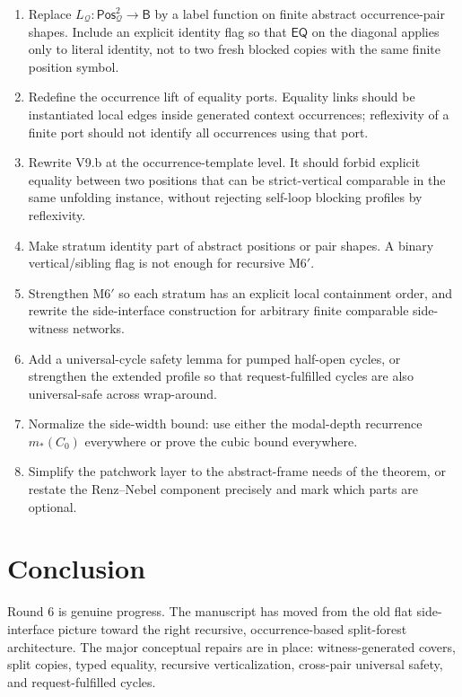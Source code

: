 \documentclass[11pt]{article}
\newcommand{\EQ}{\mathsf{EQ}}
\newcommand{\Base}{\mathsf{B}}
\newcommand{\Q}{\mathcal Q}
\newcommand{\Pos}{\mathsf{Pos}}
\begin{document}
\begin{enumerate}[leftmargin=2em,label=(R\arabic*)]
  \item Replace $L_{\Q}:\Pos_{\Q}^{2}\to\Base$ by a label function on
        finite abstract occurrence-pair shapes.  Include an explicit identity
        flag so that $\EQ$ on the diagonal applies only to literal identity,
        not to two fresh blocked copies with the same finite position symbol.
  \item Redefine the occurrence lift of equality ports.  Equality links should
        be instantiated local edges inside generated context occurrences;
        reflexivity of a finite port should not identify all occurrences using
        that port.
  \item Rewrite V9.b at the occurrence-template level.  It should forbid
        explicit equality between two positions that can be strict-vertical
        comparable in the same unfolding instance, without rejecting self-loop
        blocking profiles by reflexivity.
  \item Make stratum identity part of abstract positions or pair shapes.  A
        binary vertical/sibling flag is not enough for recursive M6$'$.
  \item Strengthen M6$'$ so each stratum has an explicit local containment
        order, and rewrite the side-interface construction for arbitrary finite
        comparable side-witness networks.
  \item Add a universal-cycle safety lemma for pumped half-open cycles, or
        strengthen the extended profile so that request-fulfilled cycles are
        also universal-safe across wrap-around.
  \item Normalize the side-width bound: use either the modal-depth recurrence
        $m_*(C_0)$ everywhere or prove the cubic bound everywhere.
  \item Simplify the patchwork layer to the abstract-frame needs of the theorem,
        or restate the Renz--Nebel component precisely and mark which parts are
        optional.
\end{enumerate}

\section{Conclusion}

Round 6 is genuine progress.  The manuscript has moved from the old flat
side-interface picture toward the right recursive, occurrence-based split-forest
architecture.  The major conceptual repairs are in place: witness-generated
covers, split copies, typed equality, recursive verticalization, cross-pair
universal safety, and request-fulfilled cycles.
\end{document}

